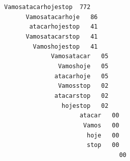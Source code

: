 \documentclass[a4paper]{article}
\begin{document}
\begin{tabbing}\tt
~Vamosatacarhojestop~~772\\
\tt ~~~~~~~~Vamosatacarhoje~~~86\\
\tt ~~~~~~~~~atacarhojestop~~~41\\
\tt ~~~~~~~~Vamosatacarstop~~~41\\
\tt ~~~~~~~~~~Vamoshojestop~~~41\\
\tt ~~~~~~~~~~~~~~~Vamosatacar~~~05\\
\tt ~~~~~~~~~~~~~~~~~Vamoshoje~~~05\\
\tt ~~~~~~~~~~~~~~~~atacarhoje~~~05\\
\tt ~~~~~~~~~~~~~~~~~Vamosstop~~~02\\
\tt ~~~~~~~~~~~~~~~~atacarstop~~~02\\
\tt ~~~~~~~~~~~~~~~~~~hojestop~~~02\\
\tt ~~~~~~~~~~~~~~~~~~~~~~~atacar~~~00\\
\tt ~~~~~~~~~~~~~~~~~~~~~~~~Vamos~~~00\\
\tt ~~~~~~~~~~~~~~~~~~~~~~~~~hoje~~~00\\
\tt ~~~~~~~~~~~~~~~~~~~~~~~~~stop~~~00\\
\tt ~~~~~~~~~~~~~~~~~~~~~~~~~~~~~~~~~~00
\end{tabbing}
\end{document}
